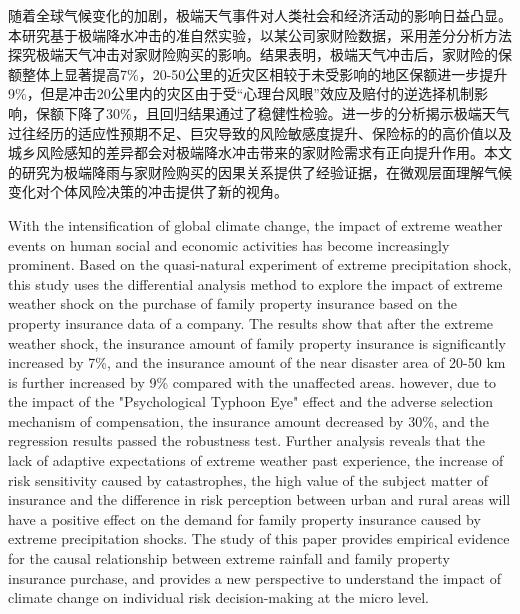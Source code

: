 \begin{cabstract}
    随着全球气候变化的加剧，极端天气事件对人类社会和经济活动的影响日益凸显。本研究基于极端降水冲击的准自然实验，以某公司家财险数据，采用差分分析方法探究极端天气冲击对家财险购买的影响。结果表明，极端天气冲击后，家财险的保额整体上显著提高7\%，20-50公里的近灾区相较于未受影响的地区保额进一步提升9\%，但是冲击20公里内的灾区由于受“心理台风眼”效应及赔付的逆选择机制影响，保额下降了30\%，且回归结果通过了稳健性检验。进一步的分析揭示极端天气过往经历的适应性预期不足、巨灾导致的风险敏感度提升、保险标的的高价值以及城乡风险感知的差异都会对极端降水冲击带来的家财险需求有正向提升作用。本文的研究为极端降雨与家财险购买的因果关系提供了经验证据，在微观层面理解气候变化对个体风险决策的冲击提供了新的视角。
\end{cabstract}
\begin{eabstract}
    With the intensification of global climate change, the impact of extreme weather events on human social and economic activities has become increasingly prominent. Based on the quasi-natural experiment of extreme precipitation shock, this study uses the differential analysis method to explore the impact of extreme weather shock on the purchase of family property insurance based on the property insurance data of a company. The results show that after the extreme weather shock, the insurance amount of family property insurance is significantly increased by 7\%, and the insurance amount of the near disaster area of 20-50 km is further increased by 9\% compared with the unaffected areas. however, due to the impact of the "Psychological Typhoon Eye" effect and the adverse selection mechanism of compensation, the insurance amount decreased by 30\%, and the regression results passed the robustness test. Further analysis reveals that the lack of adaptive expectations of extreme weather past experience, the increase of risk sensitivity caused by catastrophes, the high value of the subject matter of insurance and the difference in risk perception between urban and rural areas will have a positive effect on the demand for family property insurance caused by extreme precipitation shocks. The study of this paper provides empirical evidence for the causal relationship between extreme rainfall and family property insurance purchase, and provides a new perspective to understand the impact of climate change on individual risk decision-making at the micro level.
\end{eabstract}
